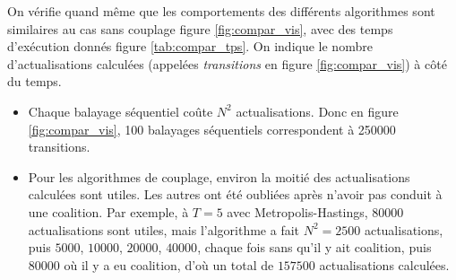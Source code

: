\documentclass[a4paper,11pt]{article}
\begin{document}
On vérifie quand même que les comportements des différents algorithmes sont similaires au cas sans couplage figure \ref{fig:compar_vis}, avec des temps d'exécution donnés figure \ref{tab:compar_tps}. On indique le nombre d'actualisations calculées (appelées \emph{transitions} en figure \ref{fig:compar_vis}) à côté du temps.
\begin{rk}

\begin{itemize}
	\item Chaque balayage séquentiel coûte $N^2$ actualisations. Donc en figure \ref{fig:compar_vis}, 100 balayages séquentiels correspondent à 250000 transitions.
	\item Pour les algorithmes de couplage, environ la moitié des actualisations calculées sont utiles. Les autres ont été oubliées après n'avoir pas conduit à une coalition. Par exemple, à $T = 5$ avec Metropolis-Hastings, $80000$ actualisations sont utiles, mais l'algorithme a fait $N^2 = 2500$ actualisations, puis $5000$, $10000$, $20000$, $40000$, chaque fois sans qu'il y ait coalition, puis $80000$ où il y a eu coalition, d'où un total de $157500$ actualisations calculées.
\end{itemize}
\end{rk}
\end{document}
